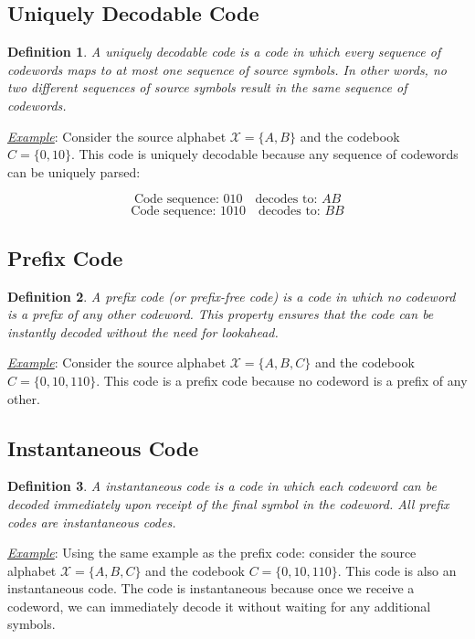 \documentclass[a4paper,10pt]{article}
\newtheorem{definition}{Definition}[section] %
\newcommand{\hlt}[1]{\colorbox{color3}{#1}}
\begin{document}
\subsection{Uniquely Decodable Code}

\begin{definition}
    A \hlt{uniquely decodable code} is a code in which every sequence of codewords maps to at most one sequence of source symbols. In other words, no two different sequences of source symbols result in the same sequence of codewords.
\end{definition}

\noindent \underline{\textit{Example}}: Consider the source alphabet $\mathcal{X} = \{A, B\}$ and the codebook $C = \{0, 10\}$. This code is uniquely decodable because any sequence of codewords can be uniquely parsed:

\[
\text{Code sequence: } 010 \quad \text{decodes to: } AB
\]
\[
\text{Code sequence: } 1010 \quad \text{decodes to: } BB
\]

\subsection{Prefix Code}

\begin{definition}
    A \hlt{prefix code} (or prefix-free code) is a code in which no codeword is a prefix of any other codeword. This property ensures that the code can be instantly decoded without the need for lookahead.
\end{definition}

\noindent \underline{\textit{Example}}: Consider the source alphabet $\mathcal{X} = \{A, B, C\}$ and the codebook $C = \{0, 10, 110\}$. This code is a prefix code because no codeword is a prefix of any other.

\subsection{Instantaneous Code}

\begin{definition}
    A \hlt{instantaneous code} is a code in which each codeword can be decoded immediately upon receipt of the final symbol in the codeword. All prefix codes are instantaneous codes.
\end{definition}

\noindent \underline{\textit{Example}}: Using the same example as the prefix code: consider the source alphabet $\mathcal{X} = \{A, B, C\}$ and the codebook $C = \{0, 10, 110\}$. This code is also an instantaneous code. The code is instantaneous because once we receive a codeword, we can immediately decode it without waiting for any additional symbols.\\
\end{document}
